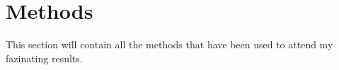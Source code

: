 \documentclass[subfiles-np.tex]{subfiles}
\begin{document}
\section{Methods}

This section will contain all the methods that have been used to attend my
fazinating results.
\end{document}
